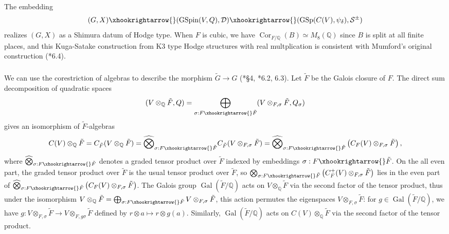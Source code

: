\documentclass{amsart}
\numberwithin{equation}{subsection}
\numberwithin{theorem}{section}
\theoremstyle{definition}
\theoremstyle{remark}
\newcommand{\bQ}{\mathbb{Q}}
\DeclareMathOperator{\GSp}{GSp}
\DeclareMathOperator{\GSpin}{GSpin}
\DeclareMathOperator{\Gal}{Gal}
\DeclareMathOperator{\Cor}{Cor}
\begin{document}
The embedding \[(G, X) \xhookrightarrow{}(\GSpin(V, Q), \mathcal{D}) \xhookrightarrow{}(\GSp(C(V),\psi_{\delta}), \mathcal{S}^{\pm})\] realizes $(G,X)$ as a Shimura datum of Hodge type. When $F$ is cubic, we have $\Cor_{F/\bQ}(B) \simeq M_8(\bQ)$ since $B$ is split at all finite places, and this Kuga-Satake construction from K3 type Hodge structures with real multplication is consistent with Mumford's original construction (\cite{MR2492400}*{6.4}). 


\subsubsection{}
We can use the corestriction of algebras to describe the morphism $\widetilde{G} \to G$ (\cite{MR248146}*{\S4}, \cite{MR2492400}*{6.2, 6.3}).
Let $\tilde{F}$ be the Galois closure of $F$. The direct sum decomposition of quadratic spaces \[(V\otimes_{\bQ} \tilde{F}, Q) = \bigoplus_{\sigma:F\xhookrightarrow{}\tilde{F}} (V\otimes_{F, \sigma}\tilde{F}, Q_{\sigma})\] gives an isomorphism of $\tilde{F}$-algebras \begin{equation} \label{eq:Cl}
    C(V)\otimes_{\bQ}\tilde{F} = C_{\tilde{F}}(V\otimes_\bQ \tilde{F}) = \widehat{\bigotimes}_{\sigma:F\xhookrightarrow{}\tilde{F}}C_{\tilde{F}}(V\otimes_{F, \sigma} \tilde{F}) = \widehat{\bigotimes}_{\sigma:F\xhookrightarrow{}\tilde{F}}\left(C_F(V)\otimes_{F, \sigma} \tilde{F}\right),
\end{equation} where $\widehat{\bigotimes}_{\sigma:F\xhookrightarrow{}\tilde{F}}$ denotes a graded tensor product over $\tilde{F}$ indexed by embeddings $\sigma:F\xhookrightarrow{}\tilde{F}$. On the all even part, the graded tensor product over $\tilde{F}$ is the usual tensor product over $\tilde{F}$, so $\bigotimes_{\sigma:F\xhookrightarrow{}\tilde{F}} \left(C_F^+(V)\otimes_{F, \sigma} \tilde{F}\right)$ lies in the even part of $\widehat{\bigotimes}_{\sigma:F\xhookrightarrow{}\tilde{F}}\left(C_F(V)\otimes_{F, \sigma} \tilde{F} \right)$. The Galois group $\Gal(\tilde{F}/\bQ)$ acts on $V\otimes_\bQ \tilde{F}$ via the second factor of the tensor product, thus under the isomorphism $V\otimes_{\bQ} \tilde{F} = \bigoplus_{\sigma:F\xhookrightarrow{}\tilde{F}} V\otimes_{F, \sigma}\tilde{F}$, this action permutes the eigenspaces $V\otimes_{F, \sigma}\tilde{F}$: for $g\in \Gal(\tilde{F}/\bQ)$, we have $g: V\otimes_{F, \sigma} \tilde{F} \to V\otimes_{F, g\sigma} \tilde{F}$  defined by $r\otimes a \mapsto r\otimes g(a)$. Similarly, $\Gal(\tilde{F}/\bQ)$ acts on $C(V)\otimes_{\bQ} \tilde{F}$ via the second factor of the tensor product. 
\end{document}
